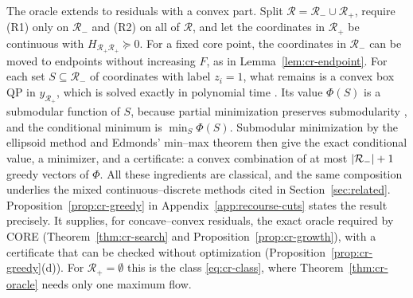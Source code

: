 \begin{remark}\label{rem:cr-mixed}
The oracle extends to residuals with a convex part. Split
$\mathcal R=\mathcal R_-\cup\mathcal R_+$, require (R1) only on $\mathcal R_-$
and (R2) on all of $\mathcal R$, and let the coordinates in $\mathcal R_+$
be continuous with $H_{\mathcal R_+\mathcal R_+}\succeq0$. For a fixed core
point, the coordinates in $\mathcal R_-$ can be moved to endpoints without
increasing $F$, as in Lemma~\ref{lem:cr-endpoint}. For each set
$S\subseteq\mathcal R_-$ of coordinates with label $z_i=1$, what remains is a
convex box QP in $y_{\mathcal R_+}$, which is solved exactly in polynomial
time \cite{KozlovTarasovKhachiyan1980}. Its value $\Phi(S)$ is a submodular
function of $S$, because partial minimization preserves submodularity
\cite{Topkis1978}, and the conditional minimum is $\min_S\Phi(S)$.
Submodular minimization by the ellipsoid method
\cite{GrotschelLovaszSchrijver1988} and Edmonds' min--max theorem
\cite{Edmonds1970} then give the exact conditional value, a minimizer, and a
certificate: a convex combination of at most $\lvert \mathcal R_-\rvert+1$ greedy
vectors of $\Phi$. All these ingredients are classical, and the same
composition underlies the mixed continuous--discrete methods cited in
Section~\ref{sec:related}.
Proposition~\ref{prop:cr-greedy} in Appendix~\ref{app:recourse-cuts} states
the result precisely. It supplies, for concave--convex residuals, the exact
oracle required by CORE (Theorem~\ref{thm:cr-search} and
Proposition~\ref{prop:cr-growth}), with a certificate that can be checked
without optimization (Proposition~\ref{prop:cr-greedy}(d)). For
$\mathcal R_+=\emptyset$ this is the class
\eqref{eq:cr-class}, where Theorem~\ref{thm:cr-oracle} needs only one
maximum flow.
\end{remark}
